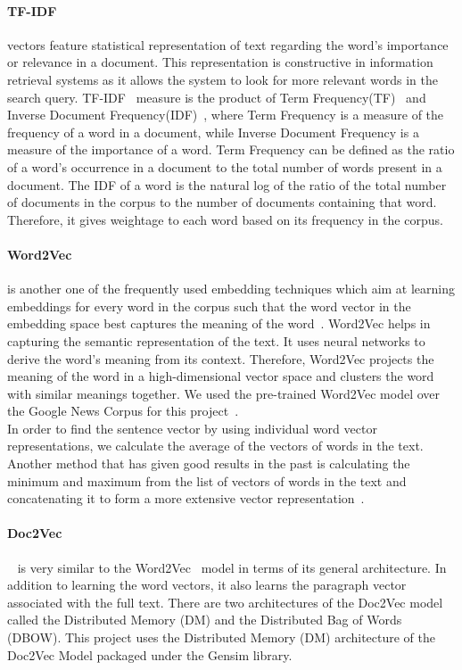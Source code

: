 \documentclass[runningheads]{llncs}
\begin{document}
\paragraph{TF-IDF} vectors feature statistical representation of text regarding the word's importance or relevance in a document. This representation is constructive in information retrieval systems as it allows the system to look for more relevant words in the search query.
TF-IDF~\cite{tfidf} measure is the product of Term Frequency(TF)~\cite{tf} and Inverse Document Frequency(IDF)~\cite{idf}, where Term Frequency is a measure of the frequency of a word in a document, while Inverse Document Frequency is a measure of the importance of a word. Term Frequency can be defined as the ratio of a word's occurrence in a document to the total number of words present in a document. The IDF of a word is the natural log of the ratio of the total number of documents in the corpus to the number of documents containing that word. Therefore, it gives weightage to each word based on its frequency in the corpus.
\paragraph{Word2Vec} is another one of the frequently used embedding techniques which aim at learning embeddings for every word in the corpus such that the word vector in the embedding space best captures the meaning of the word~\cite{nlp_prac_book}. Word2Vec helps in capturing the semantic representation of the text. It uses neural networks to derive the word’s meaning from its context. Therefore, Word2Vec projects the meaning of the word in a high-dimensional vector space and clusters the word with similar meanings together. We used the pre-trained Word2Vec model over the Google News Corpus for this project~\cite{w2v}.\\
In order to find the sentence vector by using individual word vector representations, we calculate the average of the vectors of words in the text. Another method that has given good results in the past is calculating the minimum and maximum from the list of vectors of words in the text and concatenating it to form a more extensive vector representation~\cite{minmax}.
\paragraph{Doc2Vec}~\cite{d2v} is very similar to the Word2Vec~\cite{w2v} model in terms of its general architecture. In addition to learning the word vectors, it also learns the paragraph vector associated with the full text. There are two architectures of the Doc2Vec model called the Distributed Memory (DM) and the Distributed Bag of Words (DBOW). This project uses the Distributed Memory (DM) architecture of the Doc2Vec Model packaged under the Gensim library. 
\end{document}

